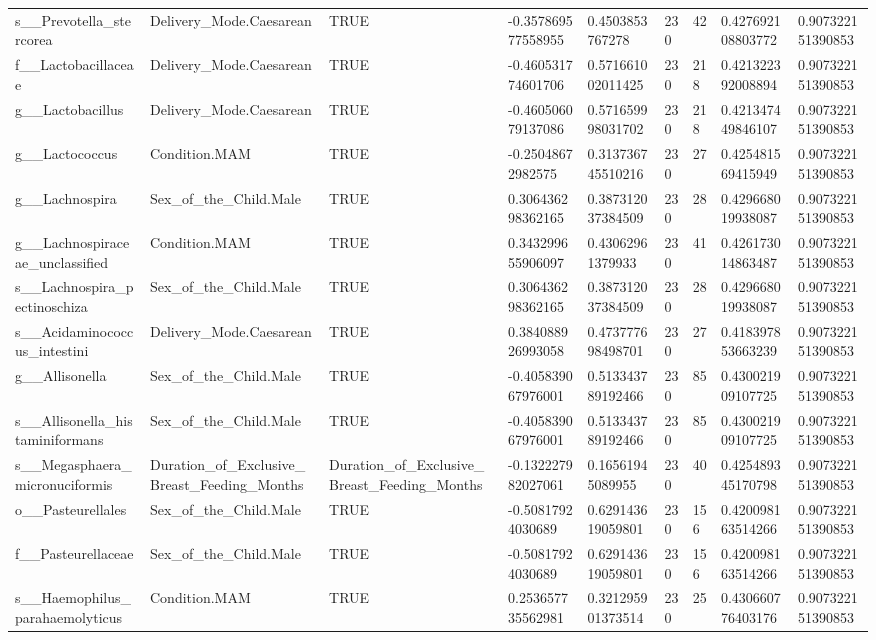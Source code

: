 \begin{longtable}{lllllllll}
s\_\_Prevotella\_stercorea & Delivery\_Mode.Caesarean & TRUE & -0.357869577558955 & 0.4503853767278 & 230 & 42 & 0.427692108803772 & 0.907322151390853 \\
f\_\_Lactobacillaceae & Delivery\_Mode.Caesarean & TRUE & -0.460531774601706 & 0.571661002011425 & 230 & 218 & 0.421322392008894 & 0.907322151390853 \\
g\_\_Lactobacillus & Delivery\_Mode.Caesarean & TRUE & -0.460506079137086 & 0.571659998031702 & 230 & 218 & 0.421347449846107 & 0.907322151390853 \\
g\_\_Lactococcus & Condition.MAM & TRUE & -0.25048672982575 & 0.313736745510216 & 230 & 27 & 0.425481569415949 & 0.907322151390853 \\
g\_\_Lachnospira & Sex\_of\_the\_Child.Male & TRUE & 0.306436298362165 & 0.387312037384509 & 230 & 28 & 0.429668019938087 & 0.907322151390853 \\
g\_\_Lachnospiraceae\_unclassified & Condition.MAM & TRUE & 0.343299655906097 & 0.43062961379933 & 230 & 41 & 0.426173014863487 & 0.907322151390853 \\
s\_\_Lachnospira\_pectinoschiza & Sex\_of\_the\_Child.Male & TRUE & 0.306436298362165 & 0.387312037384509 & 230 & 28 & 0.429668019938087 & 0.907322151390853 \\
s\_\_Acidaminococcus\_intestini & Delivery\_Mode.Caesarean & TRUE & 0.384088926993058 & 0.473777698498701 & 230 & 27 & 0.418397853663239 & 0.907322151390853 \\
g\_\_Allisonella & Sex\_of\_the\_Child.Male & TRUE & -0.405839067976001 & 0.513343789192466 & 230 & 85 & 0.430021909107725 & 0.907322151390853 \\
s\_\_Allisonella\_histaminiformans & Sex\_of\_the\_Child.Male & TRUE & -0.405839067976001 & 0.513343789192466 & 230 & 85 & 0.430021909107725 & 0.907322151390853 \\
s\_\_Megasphaera\_micronuciformis & Duration\_of\_Exclusive\_Breast\_Feeding\_Months & Duration\_of\_Exclusive\_Breast\_Feeding\_Months & -0.132227982027061 & 0.16561945089955 & 230 & 40 & 0.425489345170798 & 0.907322151390853 \\
o\_\_Pasteurellales & Sex\_of\_the\_Child.Male & TRUE & -0.50817924030689 & 0.629143619059801 & 230 & 156 & 0.420098163514266 & 0.907322151390853 \\
f\_\_Pasteurellaceae & Sex\_of\_the\_Child.Male & TRUE & -0.50817924030689 & 0.629143619059801 & 230 & 156 & 0.420098163514266 & 0.907322151390853 \\
s\_\_Haemophilus\_parahaemolyticus & Condition.MAM & TRUE & 0.253657735562981 & 0.321295901373514 & 230 & 25 & 0.430660776403176 & 0.907322151390853 \\

\end{longtable}
